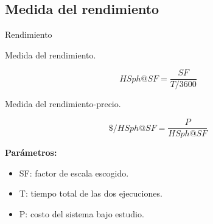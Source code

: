 	\subsection*{Medida del rendimiento}	
			
		\begin{frame}{Rendimiento}		
			
			{\color{ChetwodeBlue}\large Medida del rendimiento.}
								
					$$ HSph@SF = \frac{SF}{T/3600} $$				
				
			{\color{ChetwodeBlue}\large Medida del rendimiento-precio.}
			
					$$ \$/HSph@SF = \frac{P}{HSph@SF} $$
					
			\begin{tcolorbox}[colback=blue!5,colframe=blue!15]
				\textbf{Parámetros:}
		
				\begin{itemize}
					\fontsize{10}{10}\selectfont
					\item SF: factor de escala escogido.
					\item T: tiempo total de las dos ejecuciones.
					\item P: costo del sistema bajo estudio.
				\end{itemize}
			\end{tcolorbox}
		\end{frame}
				 